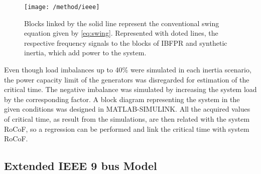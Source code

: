 \begin{figure}[h]
	\centering
	\texttt{[image: /method/ieee]}
	\label{fig:ieeesimple}
	\caption{Blocks linked by the solid line represent the conventional swing equation given by \eqref{eq:swing}. Represented with doted lines, the respective frequency signals to the blocks of IBFPR and synthetic inertia, which add power to the system.}
\end{figure}




Even though load imbalances up to 40\% were simulated in each inertia scenario, the power capacity limit of the generators was disregarded for estimation of the critical time. The negative imbalance was simulated by increasing the system load by the corresponding factor. A block diagram representing the system in the given conditions was designed in MATLAB-SIMULINK. %
All the acquired values of critical time, as result from the simulations, are then related with the system RoCoF, so a regression can be performed and link the critical time with system RoCoF.

\subsection{Extended IEEE 9 bus Model}

